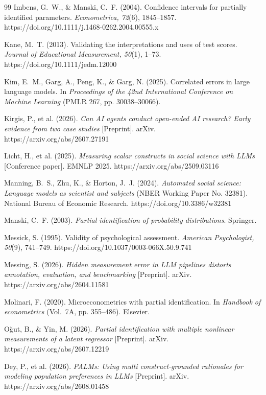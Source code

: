 \documentclass[10pt,letterpaper]{article}
\begin{document}
\begin{thebibliography}{99}
 Imbens, G.~W., \& Manski, C.~F. (2004). Confidence intervals for partially identified parameters. \textit{Econometrica, 72}(6), 1845--1857. https://doi.org/10.1111/j.1468-0262.2004.00555.x

 Kane, M.~T. (2013). Validating the interpretations and uses of test scores. \textit{Journal of Educational Measurement, 50}(1), 1--73. https://doi.org/10.1111/jedm.12000

 Kim, E.~M., Garg, A., Peng, K., \& Garg, N. (2025). Correlated errors in large language models. In \textit{Proceedings of the 42nd International Conference on Machine Learning} (PMLR 267, pp. 30038--30066).

 Kirgis, P., et al. (2026). \textit{Can AI agents conduct open-ended AI research? Early evidence from two case studies} [Preprint]. arXiv. https://arxiv.org/abs/2607.27191

 Licht, H., et al. (2025). \textit{Measuring scalar constructs in social science with LLMs} [Conference paper]. EMNLP 2025. https://arxiv.org/abs/2509.03116

 Manning, B.~S., Zhu, K., \& Horton, J.~J. (2024). \textit{Automated social science: Language models as scientist and subjects} (NBER Working Paper No. 32381). National Bureau of Economic Research. https://doi.org/10.3386/w32381

 Manski, C.~F. (2003). \textit{Partial identification of probability distributions}. Springer.

 Messick, S. (1995). Validity of psychological assessment. \textit{American Psychologist, 50}(9), 741--749. https://doi.org/10.1037/0003-066X.50.9.741

 Messing, S. (2026). \textit{Hidden measurement error in LLM pipelines distorts annotation, evaluation, and benchmarking} [Preprint]. arXiv. https://arxiv.org/abs/2604.11581

 Molinari, F. (2020). Microeconometrics with partial identification. In \textit{Handbook of econometrics} (Vol.~7A, pp. 355--486). Elsevier.

 O\u{g}ut, B., \& Yin, M. (2026). \textit{Partial identification with multiple nonlinear measurements of a latent regressor} [Preprint]. arXiv. https://arxiv.org/abs/2607.12219

 Dey, P., et al. (2026). \textit{PALMs: Using multi construct-grounded rationales for modeling population preferences in LLMs} [Preprint]. arXiv. https://arxiv.org/abs/2608.01458


\end{thebibliography}
\end{document}
